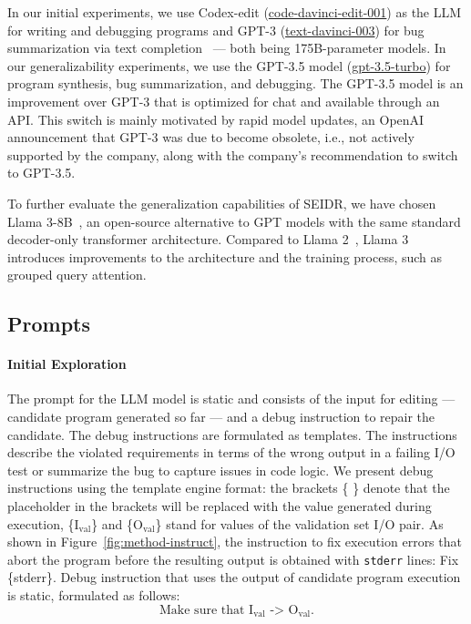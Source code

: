 In our initial experiments, we use Codex-edit (\href{https://openai.com/index/gpt-3-edit-insert/}{code-davinci-edit-001})
as the LLM for writing and debugging programs and GPT-3 (\href{https://platform.openai.com/docs/deprecations}{text-davinci-003}) for bug summarization via text completion~\cite{brown2020:language} --- both being 175B-parameter models.
In our generalizability experiments, we use the GPT-3.5 model (\href{https://platform.openai.com/docs/models/gpt-3-5-turbo}{gpt-3.5-turbo}) for program synthesis, bug summarization, and debugging. 
The GPT-3.5 model is an improvement over GPT-3 that is optimized for chat and available through an API.
This switch is mainly motivated by rapid model updates, an OpenAI announcement that GPT-3 was due to become obsolete, i.e., not actively supported by the company, along with the company's recommendation to switch to GPT-3.5. 

To further evaluate the generalization capabilities of SEIDR, we have chosen Llama 3-8B~\cite{roziereCodeLlamaOpen2024}, an open-source alternative to GPT models with the same standard decoder-only transformer architecture. 
Compared to Llama 2~\cite{touvron2023:llama}, Llama 3 introduces improvements to the architecture and the training process, such as grouped query attention.

\newpage\subsection{Prompts}
\label{sec:seidr-prompts}

\paragraph{Initial Exploration}
\label{sec:seidr-prompt-strategies}

The prompt for the LLM model is static and consists of the input for editing --- candidate program generated so far --- and a debug instruction to repair the candidate. 
The debug instructions are formulated as templates. The instructions describe the violated requirements in terms of the wrong output in a failing I/O test or summarize the bug to capture issues in code logic.
We present debug instructions using the template engine format: the brackets \{ \} denote that the placeholder in the brackets will be replaced with the value generated during execution, \{I$_{\text{val}}$\} and \{O$_{\text{val}}$\} stand for values of the validation set I/O pair. As shown in Figure~\ref{fig:method-instruct}, the instruction to fix execution errors that abort the program before the resulting output is obtained with \texttt{stderr} lines: Fix \{stderr\}. Debug instruction that uses the output of candidate program execution is static, formulated as follows: 
\begin{equation}\label{seidr:prompt-0} 
    \text{Make sure that I}_{\text{val}} \text{ -> O}_{\text{val}}. \tag{S0}
\end{equation}


